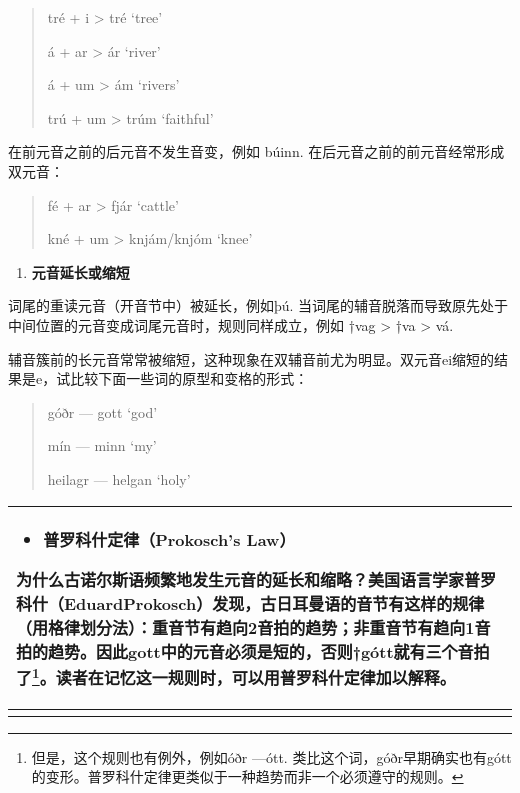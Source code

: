 \begin{quote}
  tré + i \textgreater{} tré `tree'

  á + ar \textgreater{} ár `river'

  á + um \textgreater{} ám `rivers'

  trú + um \textgreater{} trúm `faithful'
\end{quote}

在前元音之前的后元音不发生音变，例如 búinn.
在后元音之前的前元音经常形成双元音：

\begin{quote}
  fé + ar \textgreater{} fjár `cattle'

  kné + um \textgreater{} knjám/knjóm `knee'
\end{quote}

\begin{enumerate}
  \def\labelenumi{\Alph{enumi}.}
  \setcounter{enumi}{2}
  \item
        \textbf{元音延长或缩短}
\end{enumerate}

词尾的重读元音（开音节中）被延长，例如þú.
当词尾的辅音脱落而导致原先处于中间位置的元音变成词尾元音时，规则同样成立，例如
†vag \textgreater{} †va \textgreater{} vá.

辅音簇前的长元音常常被缩短，这种现象在双辅音前尤为明显。双元音ei缩短的结果是e，试比较下面一些词的原型和变格的形式：

\begin{quote}
  góðr --- gott `god'

  mín --- minn `my'

  heilagr --- helgan `holy'
\end{quote}

\begin{longtable}{l}
  \toprule
  \begin{itemize}\item  \textbf{普罗科什定律（Prokosch's Law）}\end{itemize}为什么古诺尔斯语频繁地发生元音的延长和缩略？美国语言学家普罗科什（EduardProkosch）发现，古日耳曼语的音节有这样的规律（用格律划分法）：\textbf{重音节有趋向2音拍的趋势；非重音节有趋向1音拍的趋势。}因此gott中的元音必须是短的，否则†gótt就有三个音拍了\footnote{但是，这个规则也有例外，例如óðr  ---ótt.  类比这个词，góðr早期确实也有gótt的变形。普罗科什定律更类似于一种趋势而非一个必须遵守的规则。}。读者在记忆这一规则时，可以用普罗科什定律加以解释。 \\
  \midrule
  \endhead
  \bottomrule
  \endfoot
\end{longtable}

